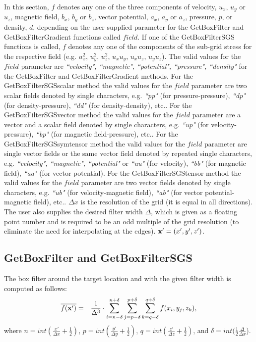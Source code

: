 \documentclass[11pt]{article}
\def\bea{\begin{eqnarray}}
\def\eea{\end{eqnarray}}
\begin{document}
In this section, $f$ denotes any one of the three components of velocity, $u_x$, $u_y$ or $u_z$, 
magnetic field, $b_x$, $b_y$ or $b_z$, vector potential, $a_x$, $a_y$ or $a_z$, pressure, $p$, or density, $d$,  
depending on the user supplied parameter for the GetBoxFilter and GetBoxFilterGradient functions called $field$. If
one of the GetBoxFilterSGS functions is called, $f$ denotes any one of the components of the sub-grid
stress for the respective field (e.g. $u_x^2$, $u_y^2$, $u_z^2$, $u_x u_y$, $u_x u_z$, $u_y u_z$).
The valid values
for the $field$ parameter are \emph{``velocity", ``magnetic", ``potential", ``pressure", ``density"} for the GetBoxFilter and GetBoxFilterGradient methods.
For the GetBoxFilterSGSscalar method the valid values for the $field$ parameter are two scalar fields denoted by single characters, 
e.g. \emph{``pp"} (for pressure-pressure), \emph{``dp"} (for density-pressure), \emph{``dd"} (for density-density), etc..
For the GetBoxFilterSGSvector method the valid values for the $field$ parameter are a vector and a scalar field denoted by single characters, 
e.g. \emph{``up"} (for velocity-pressure), \emph{``bp"} (for magnetic field-pressure), etc..
For the GetBoxFilterSGSsymtensor method the valid values for the $field$ parameter are single vector fields 
or the same vector field denoted by repeated single characters, 
e.g. \emph{``velocity", ``magnetic", ``potential"} or \emph{``uu"} (for velocity), \emph{``bb"} (for magnetic field), \emph{``aa"} (for vector potential).
For the GetBoxFilterSGStensor method the valid values for the $field$ parameter are two vector fields denoted by single characters, 
e.g. \emph{``ub"} (for velocity-magnetic field), \emph{``ab"} (for vector potential-magnetic field), etc..
$\Delta x$ is the resolution of the grid
(it is equal in all directions). The user also supplies the desired 
filter width $\Delta$, which is given as a floating point number and is required to be an odd multiple of the grid
resolution (to eliminate the need for interpolating at the edges). ${\bf x'}=(x',y',z')$. 

\subsection{GetBoxFilter and GetBoxFilterSGS}
The box filter around the target location and with the given filter width is computed as follows:
\bea \overline{f({\bf x'})} &=& \frac{1}{\Delta^3} \cdot
\sum_{i=n - \delta}^{n + \delta}\sum_{j=p - \delta}^{p + \delta}\sum_{k=q - \delta}^{q + \delta}f(x_{i},y_{j},z_{k}),\eea
where $n=int(\frac{x'}{\Delta x}+\frac{1}{2})$, $p=int(\frac{y'}{\Delta
y}+\frac{1}{2})$, $q=int(\frac{z'}{\Delta z}+\frac{1}{2})$, and $\delta = int(\frac{1}{2}\frac{\Delta}{\Delta x}$).
\end{document}
